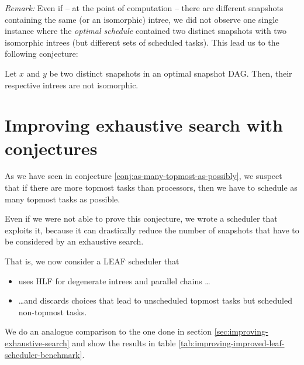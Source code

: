 \emph{Remark:} Even if -- at the point of computation -- there are different snapshots containing the same (or an isomorphic) intree, we did not observe one single instance where the \emph{optimal schedule} contained two distinct snapshots with two isomorphic intrees (but different sets of scheduled tasks). This lead us to the following conjecture:

\begin{conjecture}
  Let $x$ and $y$ be two distinct snapshots in an optimal snapshot DAG. Then, their respective intrees are not isomorphic.
\end{conjecture}

\section{Improving exhaustive search with conjectures}
\label{sec:improving-leaf-with-conjectures}

As we have seen in conjecture \ref{conj:as-many-topmost-as-possibly}, we suspect that if there are more topmost tasks than processors, then we have to schedule as many topmost tasks as possible. 

Even if we were not able to prove this conjecture, we wrote a scheduler that exploits it, because it can drastically reduce the number of snapshots that have to be considered by an exhaustive search.

That is, we now consider a LEAF scheduler that
\begin{itemize}
\item uses HLF for degenerate intrees and parallel chains \dots
\item \dots and discards choices that lead to unscheduled topmost tasks but scheduled non-topmost tasks.
\end{itemize}

We do an analogue comparison to the one done in section \ref{sec:improving-exhaustive-search} and show the results in table \ref{tab:improving-improved-leaf-scheduler-benchmark}.

